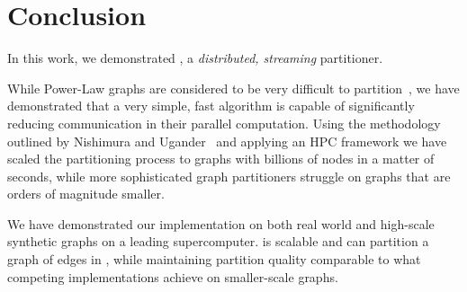 \section{Conclusion} \label{sec:conc}
In this work, we demonstrated \ourmethod, a \emph{distributed, streaming} partitioner. 

While Power-Law graphs are considered to be very difficult to partition~\cite{Abou-Rjeili:2006:MAP:1898953.1899055}, we have demonstrated that a very simple, fast algorithm is capable of significantly reducing communication in their parallel computation. Using the methodology outlined by Nishimura and Ugander~\cite{nishimura2013restream} and applying an HPC framework we have scaled the partitioning process to graphs with billions of nodes in a matter of seconds, while more sophisticated graph partitioners struggle on graphs that are orders of magnitude smaller.

We have demonstrated our implementation on both real world and high-scale synthetic graphs on a leading supercomputer. \ourmethod is scalable and can partition a graph of \largestgraphedges edges in \largestgraphtime, while maintaining partition quality comparable to what competing implementations achieve on smaller-scale graphs. 
